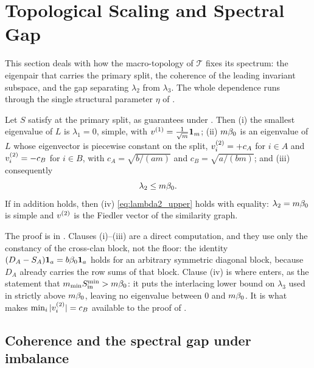 \section{Topological Scaling and Spectral Gap}\label{sec:bridging}

This section deals with how the macro-topology of $\mathcal{T}$ fixes its spectrum: the eigenpair that carries the
primary split, the coherence of the leading invariant subspace, and the gap
separating $\lambda_2$ from $\lambda_3$. The whole dependence runs through the single
structural parameter $\eta$ of .

\begin{lemma}\label{lem:A-decomp}
Let $S$ satisfy  at the primary split, as  guarantees
under . Then (i) the smallest eigenvalue of $L$ is
$\lambda_1=0$, simple, with $v^{(1)}=\tfrac1{\sqrt m}\mathbf{1}_m$; (ii) $m\beta_0$ is an
eigenvalue of $L$ whose eigenvector is piecewise constant on the split,
$v^{(2)}_i=+c_A$ for $i\in A$ and $v^{(2)}_i=-c_B$ for $i\in B$, with $c_A=\sqrt{b/(am)}$
and $c_B=\sqrt{a/(bm)}$; and (iii) consequently
\begin{equation}\label{eq:lambda2_upper}
   \lambda_2 \le m\beta_0 .
\end{equation}
If in addition  holds, then (iv) \eqref{eq:lambda2_upper} holds with
equality: $\lambda_2=m\beta_0$ is simple and $v^{(2)}$ is the Fiedler vector of the
similarity graph.
\end{lemma}

\noindent The proof is in . Clauses (i)--(iii) are a direct
computation, and they use only the constancy of the cross-clan block, not the floor:
the identity $(D_A-S_A)\mathbf{1}_a=b\beta_0\mathbf{1}_a$ holds for an arbitrary symmetric diagonal
block, because $D_A$ already carries the row sums of that block. Clause (iv) is where
 enters, as the statement that $m_{\min}S_{\mathrm{in}}^{\min}>m\beta_0$: it puts
the interlacing lower bound on $\lambda_3$ used in  strictly above
$m\beta_0$, leaving no eigenvalue between $0$ and $m\beta_0$. It is what makes
$\min_i|v^{(2)}_i|=c_B$ available to the proof of .

\subsection{Coherence and the spectral gap under imbalance}\label{sec:bridging-scaling}

